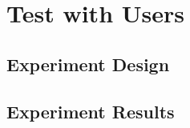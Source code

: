 \section{Test with Users}
\label{sec:test}

\subsection{Experiment Design}

\subsection{Experiment Results}